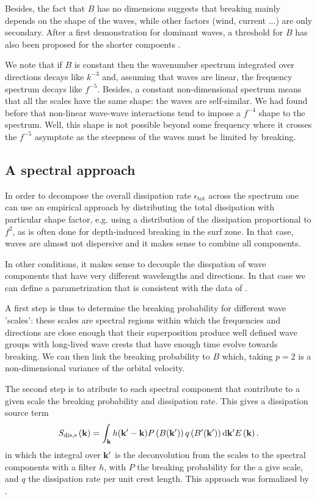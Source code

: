 Besides, the fact that 
$B$ has no dimensions suggests that breaking mainly depends on the shape of the waves, while other factors (wind, current ...) are 
only secondary.   After a first demonstration for dominant waves, a threshold for $B$ has also been proposed for the shorter 
compoents \citep{Banner&al.2002}.

We note that if $B$ is constant then the wavenumber spectrum integrated over directions decays like $k^{-3}$ and, 
assuming that waves are linear, the frequency spectrum decays like $f^{-5}$. Besides, a constant non-dimensional spectrum 
means that all the scales have the same shape: the waves are self-similar. We had found before that non-linear wave-wave 
interactions tend to impose a $f^{-4}$ shape to the spectrum. Well, this shape is not possible beyond some frequency 
where it crosses the $f^{-5}$ asymptote as the steepness of the waves must be limited by breaking. 



\subsection{A spectral approach} 
In order to decompose the overall dissipation rate $ \epsilon_{\mathrm{tot}} $ across the 
spectrum one can use an empirical approach by distributing the total dissipation with 
particular shape factor, e.g. using a distribution of the dissipation proportional to  $f^2$, as is often done 
for depth-induced breaking in the surf zone. In that case, waves are almost not dispersive and it makes sense to 
combine all components. 

In other conditions, it makes sense to decouple the disspation of wave components that 
have very different wavelengths and directions. In that case we can define a parametrization 
that is consistent with the data of \cite{Banner&al.2000}. 

A first step is thus to determine the breaking probability for different wave 'scales': these scales are spectral regions
within which the frequencies and directions are close enough that their superposition 
produce well defined wave groups with long-lived wave crests that have enough time evolve towards breaking. 
We can then link the breaking probability to  $B$ which, taking $p=2$ is a non-dimensional variance of the orbital velocity. 

The second step is to atribute to each spectral component that contribute to a given scale 
the breaking probability and dissipation rate. This gives a dissipation source term 
\begin{equation}
  S_{\mathrm{dis,s}}\left(\mathbf{k}\right)=
 \int_{\mathbf{k}} h(\mathbf{k^{\prime}}-\mathbf{k}) P \left(B(\mathbf{k^{\prime}})\right)q\left(B'(\mathbf{k^{\prime}})\right) \mathrm{d} \mathbf{k^{\prime}} E\left(\mathbf{k}\right) .\label{Sds_tot_FA}
\end{equation}
in which the integral over  $\mathbf{k}'$ is the deconvolution from the scales to the spectral components with a filter $h$, 
with  $P$  the breaking probability for the a give scale, and  $q$ the dissipation rate per unit crest length. 
This approach was formalized by  \cite{Filipot&al.2010,Filipot&Ardhuin2012}.

